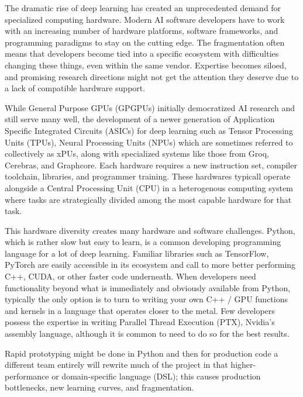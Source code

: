 \documentclass[manuscript,screen,review,format=acmsmall]{acmart}
\begin{document}
The dramatic rise of deep learning has created an unprecedented demand for specialized computing hardware. Modern AI software developers have to work with an increasing number of hardware platforms, software frameworks, and programming paradigms to stay on the cutting edge. The fragmentation often means that developers become tied into a specific ecosystem with difficulties changing these things, even within the same vendor. Expertise becomes siloed, and promising research directions might not get the attention they deserve due to a lack of compatible hardware support.

While General Purpose GPUs (GPGPUs) initially democratized AI research and still serve many well, the development of a newer generation of Application Specific Integrated Circuits (ASICs) for deep learning such as Tensor Processing Units (TPUs), Neural Processing Units (NPUs) which are sometimes referred to collectively as xPUs, along with specialized systems like those from Groq, Cerebras, and Graphcore. Each hardware requires a new instruction set, compiler toolchain, libraries, and programmer training. These hardwares typicall operate alongside a Central Processing Unit (CPU) in a heterogenous computing system where tasks are strategically divided among the most capable hardware for that task.

This hardware diversity creates many hardware and software challenges. Python, which is rather slow but easy to learn, is a common developing programming language for a lot of deep learning. Familiar libraries such as TensorFlow, PyTorch are easily accessible in its ecosystem and call to more better performing C++, CUDA, or other faster code underneath. When developers need functionality beyond what is immediately and obviously available from Python, typically the only option is to turn to writing your own C++ / GPU functions and kernels in a language that operates closer to the metal. Few developers possess the expertise in writing Parallel Thread Execution (PTX), Nvidia's assembly language, although it is common to need to do so for the best results.

Rapid prototyping might be done in Python and then for production code a different team entirely will rewrite much of the project in that higher-performance or domain-specific language (DSL); this causes production bottlenecks, new learning curves, and fragmentation.
\end{document}
